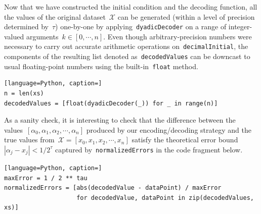 \documentclass{article}
\begin{document}
\noindent Now that we have constructed the initial condition and the decoding function, all the values of the original dataset~$\mathcal{X}$ can be generated (within a level of precision determined by~$\tau$) one-by-one by applying~\texttt{dyadicDecoder} on a range of integer-valued arguments~$k \in [0, \cdots , n]$. Even though arbitrary-precision numbers were necessary to carry out accurate arithmetic operations on~\texttt{decimalInitial}, the components of the resulting list denoted as~\texttt{decodedValues} can be downcast to usual floating-point numbers using the built-in~\texttt{float} method. \\
\begin{lstlisting}[language=Python, caption=]
n = len(xs)
decodedValues = [float(dyadicDecoder(_)) for _ in range(n)]
\end{lstlisting}

\vspace{0.2cm}

\noindent As a sanity check, it is interesting to check that the difference between the values~$[\alpha_0, \alpha_1, \alpha_2, \cdots, \alpha_n]$ produced by our encoding/decoding strategy and the true values from~$\mathcal{X}=[x_0, x_1, x_2, \cdots , x_n]$ satisfy the theoretical error bound~$\left| \alpha_j - x_j  \right| < 1/2^\tau$ captured by~\texttt{normalizedErrors} in the code fragment below.  \\
\begin{lstlisting}[language=Python, caption=]
maxError = 1 / 2 ** tau
normalizedErrors = [abs(decodedValue - dataPoint) / maxError 
                    for decodedValue, dataPoint in zip(decodedValues, xs)]
\end{lstlisting}
\end{document}

